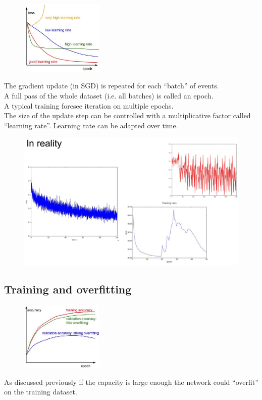 \begin{figure}
	\includegraphics[width=0.35\textwidth]{figure_ml/learning_rate.png}
\end{figure} 

The gradient update (in SGD) is repeated for each “batch” of events.\\

A full pass of the whole dataset (i.e. all batches) is called an epoch.\\

A typical training foresee iteration on multiple epochs.\\

The size of the update step can be controlled with a multiplicative factor called “learning rate”. Learning rate can be adapted over time.

\begin{figure}[ht]
	\centering
	\includegraphics[width=0.8\linewidth]{figure_ml/real_lr.png}
\end{figure}
\FloatBarrier


\subsection{Training and overfitting}

\begin{figure}
	\includegraphics[width=0.35\textwidth]{figure_ml/training_overfitting.png}
\end{figure} 
As discussed previously if the capacity is large enough the network could “overfit” on the training dataset.

